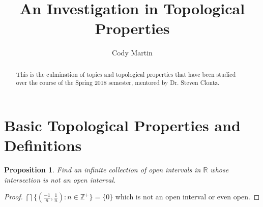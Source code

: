 \documentclass{amsart}
\theoremstyle{plain}
\newtheorem{proposition}[theorem]{Proposition}
\theoremstyle{definition}
\theoremstyle{remark}
\begin{document}
\title{An Investigation in Topological Properties}


\author{Cody Martin}
\address{1313 Schillinger Rd. S. 
Apt. 3407
Mobile, AL 36695}









\begin{abstract}
  This is the culmination of topics and topological properties that have been studied over the course of the Spring 2018 semester, mentored by Dr. Steven Clontz.
\end{abstract}


\maketitle







\section{Basic Topological Properties and Definitions}

	\begin{proposition}
	Find an infinite collection of open intervals in $\mathbb{R}$ whose intersection is not an open interval.
	\end{proposition}
	\begin{proof}
	$\bigcap\lbrace (\frac{-1}{n}, \frac{1}{n}) : n \in \mathbb{Z}^+\rbrace = \lbrace 0 \rbrace$ which is not an open interval or even open.
	\end{proof}
\end{document}
